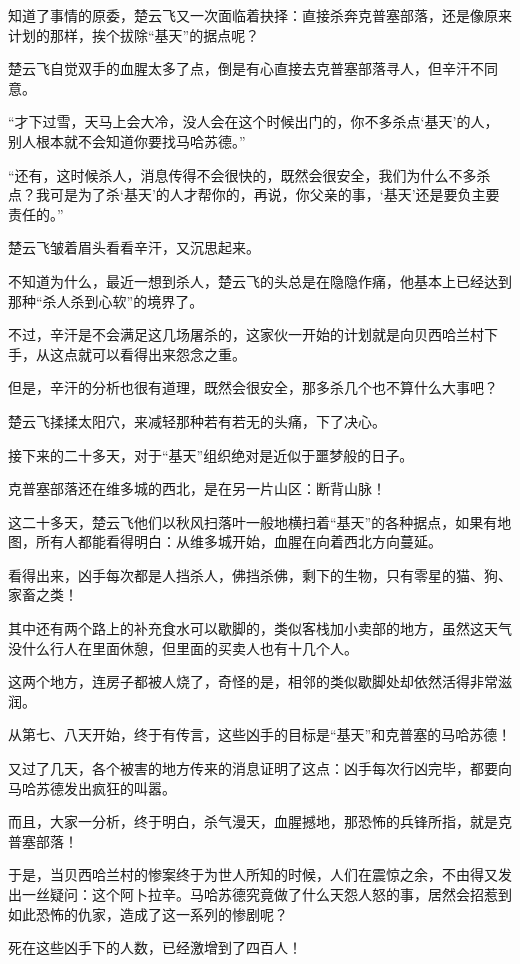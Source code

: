 知道了事情的原委，楚云飞又一次面临着抉择：直接杀奔克普塞部落，还是像原来计划的那样，挨个拔除“基天”的据点呢？

楚云飞自觉双手的血腥太多了点，倒是有心直接去克普塞部落寻人，但辛汗不同意。

“才下过雪，天马上会大冷，没人会在这个时候出门的，你不多杀点‘基天’的人，别人根本就不会知道你要找马哈苏德。”

“还有，这时候杀人，消息传得不会很快的，既然会很安全，我们为什么不多杀点？我可是为了杀‘基天’的人才帮你的，再说，你父亲的事，‘基天’还是要负主要责任的。”

楚云飞皱着眉头看看辛汗，又沉思起来。

不知道为什么，最近一想到杀人，楚云飞的头总是在隐隐作痛，他基本上已经达到那种“杀人杀到心软”的境界了。

不过，辛汗是不会满足这几场屠杀的，这家伙一开始的计划就是向贝西哈兰村下手，从这点就可以看得出来怨念之重。

但是，辛汗的分析也很有道理，既然会很安全，那多杀几个也不算什么大事吧？

楚云飞揉揉太阳穴，来减轻那种若有若无的头痛，下了决心。

接下来的二十多天，对于“基天”组织绝对是近似于噩梦般的日子。

克普塞部落还在维多城的西北，是在另一片山区：断背山脉！

这二十多天，楚云飞他们以秋风扫落叶一般地横扫着“基天”的各种据点，如果有地图，所有人都能看得明白：从维多城开始，血腥在向着西北方向蔓延。

看得出来，凶手每次都是人挡杀人，佛挡杀佛，剩下的生物，只有零星的猫、狗、家畜之类！

其中还有两个路上的补充食水可以歇脚的，类似客栈加小卖部的地方，虽然这天气没什么行人在里面休憩，但里面的买卖人也有十几个人。

这两个地方，连房子都被人烧了，奇怪的是，相邻的类似歇脚处却依然活得非常滋润。

从第七、八天开始，终于有传言，这些凶手的目标是“基天”和克普塞的马哈苏德！

又过了几天，各个被害的地方传来的消息证明了这点：凶手每次行凶完毕，都要向马哈苏德发出疯狂的叫嚣。

而且，大家一分析，终于明白，杀气漫天，血腥撼地，那恐怖的兵锋所指，就是克普塞部落！

于是，当贝西哈兰村的惨案终于为世人所知的时候，人们在震惊之余，不由得又发出一丝疑问：这个阿卜拉辛。马哈苏德究竟做了什么天怨人怒的事，居然会招惹到如此恐怖的仇家，造成了这一系列的惨剧呢？

死在这些凶手下的人数，已经激增到了四百人！

